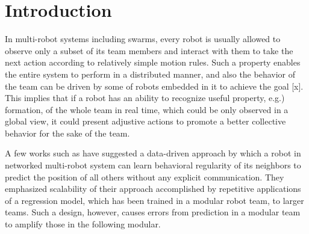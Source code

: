 \documentclass[letterpaper, 10 pt, conference]{ieeeconf}  %
\begin{document}
\begin{abstract}
		
		
		
		
%		
	\end{abstract}
	
	
	
	\section{Introduction}
	\label{sec:intro}
	
	In multi-robot systems including swarms, every robot is usually allowed to observe 
	only a subset of its team members and interact with them to take the next action 
	according to relatively simple motion rules. 
	Such a property enables the entire system to perform in a distributed manner, and 
	also the behavior of the team can be driven by some of robots embedded in it to 
	achieve the goal [x]. 
	This implies that if a robot has an ability to recognize useful property, e.g.) formation, 
	of the whole team in real time, which could be only observed in a global view,
	it could present adjustive actions to promote a better collective behavior 
	for the sake of the team.
	
	A few works such as \cite{Choi17} have suggested a data-driven approach by which a robot in 
	networked multi-robot system can learn behavioral regularity of its neighbors to 
	predict the position of all others without any explicit communication.
	They emphasized scalability of their approach accomplished by repetitive applications of a regression model, which has been trained in a modular robot team, to larger teams.  
	Such a design, however, causes errors from prediction in a modular team to amplify 
	those in the following modular. 
	
\end{document}
